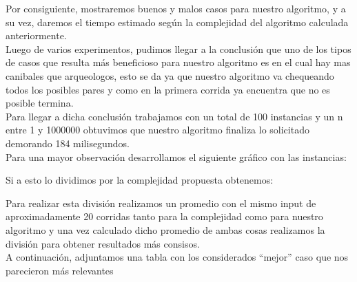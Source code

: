 \indent Por consiguiente, mostraremos buenos y malos casos para nuestro algoritmo, y a su vez, daremos el tiempo estimado 
seg\'un la complejidad del algoritmo calculada anteriormente.\\

Luego de varios experimentos, pudimos llegar a la conclusi\'on que uno de los tipos de casos que resulta m\'as beneficioso para nuestro algoritmo
es en el cual hay mas canibales que arqueologos, esto se da ya que nuestro algoritmo va chequeando todos los posibles pares y como en la primera corrida ya encuentra que no es posible termina.\\

Para llegar a dicha conclusi\'on trabajamos con un total de 100 instancias y un n entre 1 y 1000000 obtuvimos que nuestro
algoritmo finaliza lo solicitado demorando 184 milisegundos.\\

Para una mayor observaci\'on desarrollamos el siguiente gr\'afico con las instancias:\\

\vspace*{0.3cm} \vspace*{0.3cm}
  \begin{center}
  \end{center}
  \vspace*{0.3cm}


Si a esto lo dividimos por la complejidad propuesta obtenemos:\\

\vspace*{0.3cm} \vspace*{0.3cm}
  \begin{center}
  \end{center}
  \vspace*{0.3cm}

 Para realizar esta divisi\'on realizamos un promedio con el mismo input de aproximadamente 20 corridas
tanto para la complejidad como para nuestro algoritmo y una vez calculado dicho promedio de ambas cosas realizamos la divisi\'on para
obtener resultados m\'as consisos.\\ 

  
  
A continuaci\'on, adjuntamos una tabla con los considerados “mejor” caso que nos parecieron m\'as relevantes

